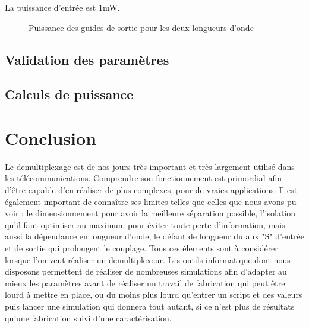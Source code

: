 \documentclass[a4paper,11pt]{report}
\begin{document}
La puissance d'entrée est 1mW.

\begin{figure}[h]
    \begin{center}
        \caption{Puissance des guides de sortie pour les deux longueurs d'onde}
        \label{fig:}
    \end{center}
\end{figure}

\section{Validation des paramètres}
\section{Calculs de puissance}
\chapter*{Conclusion}

Le demultiplexage est de nos jours très important et très largement utilisé dans les télécommunications. Comprendre son fonctionnement est primordial afin d'être capable d'en réaliser de plus complexes, pour de vraies applications. 
Il est également important de connaître ses limites telles que celles que nous avons pu voir : le dimensionnement pour avoir la meilleure séparation possible, l'isolation qu'il faut optimiser au maximum pour éviter toute perte d'information, mais aussi la dépendance en longueur d'onde, le défaut de longueur du aux "S" d'entrée et de sortie qui prolongent le couplage. Tous ces élements sont à considérer lorsque l'on veut réaliser un demultiplexeur. Les outils informatique dont nous disposons permettent de réaliser de nombreuses simulations afin d'adapter au mieux les paramètres avant de réaliser un travail de fabrication qui peut être lourd à mettre en place, ou du moins plus lourd qu'entrer un script et des valeurs puis lancer une simulation qui donnera tout autant, si ce n'est plus de résultats qu'une fabrication suivi d'une caractérisation. 

\nocite{*}


\end{document}
